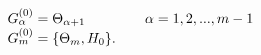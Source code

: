 \begin{equation}
 \begin{array}{l}
 G_\alpha ^{(0)}=\Theta_{\alpha+1} \hspace{1.5cm} \alpha=1,2,...,m-1 \\ G_m ^{(0)}
 =\{\Theta_m , H_0\}.
 \end{array}
 \label{g2}
 \end{equation}

